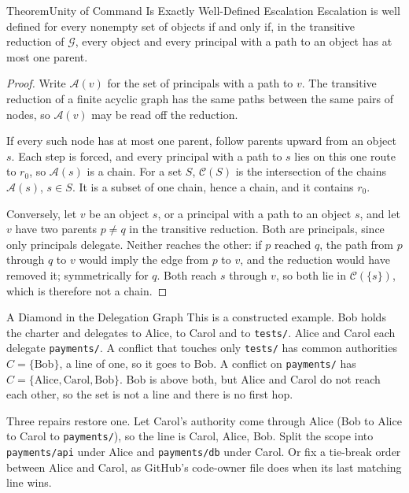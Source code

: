 \begin{pdclaim}{Theorem}{Unity of Command Is Exactly Well-Defined Escalation}
\setlength{\parskip}{4pt plus 1pt}
\label{thm:ls-unity-of-command}
Escalation is well defined for every nonempty set of objects if and only if,
in the transitive reduction of $\mathcal G$, every object and every principal with a
path to an object has at most one parent.
\end{pdclaim}
\begin{proof}
\setlength{\parskip}{4pt plus 1pt}
Write $\mathcal A(v)$ for the set of principals with a path to $v$. The transitive
reduction of a finite acyclic graph has the same paths between the same pairs
of nodes, so $\mathcal A(v)$ may be read off the reduction.

If every such node has at most one parent, follow parents upward from an
object $s$. Each step is forced, and every principal with a path to $s$ lies on
this one route to $r_0$, so $\mathcal A(s)$ is a chain. For a set $S$, $\mathcal C(S)$ is the
intersection of the chains $\mathcal A(s)$, $s\in S$. It is a subset of one chain, hence
a chain, and it contains $r_0$.

Conversely, let $v$ be an object $s$, or a principal with a path to an
object $s$, and let $v$ have two parents $p\ne q$ in the transitive reduction.
Both are principals, since only principals delegate. Neither reaches the
other: if $p$ reached $q$, the path from $p$ through $q$ to $v$ would imply the
edge from $p$ to $v$, and the reduction would have removed it; symmetrically
for $q$. Both reach $s$ through $v$, so both lie in $\mathcal C(\{s\})$, which is
therefore not a chain.
\end{proof}

\begin{pdexample}{A Diamond in the Delegation Graph}
\setlength{\parskip}{4pt plus 1pt}
This is a constructed example. Bob holds the charter and delegates to Alice,
to Carol and to \texttt{tests/}. Alice and Carol each delegate
\texttt{payments/}. A conflict that touches only \texttt{tests/} has common
authorities $C=\{\text{Bob}\}$, a line of one, so it goes to Bob. A conflict on
\texttt{payments/} has $C=\{\text{Alice},\text{Carol},\text{Bob}\}$. Bob is above
both, but Alice and Carol do not reach each other, so the set is not a line
and there is no first hop.

Three repairs restore one. Let Carol's authority come through Alice (Bob to
Alice to Carol to \texttt{payments/}), so the line is Carol, Alice, Bob. Split
the scope into \texttt{payments/api} under Alice and \texttt{payments/db} under
Carol. Or fix a tie-break order between Alice and Carol, as GitHub's code-owner
file does when its last matching line wins.
\end{pdexample}

